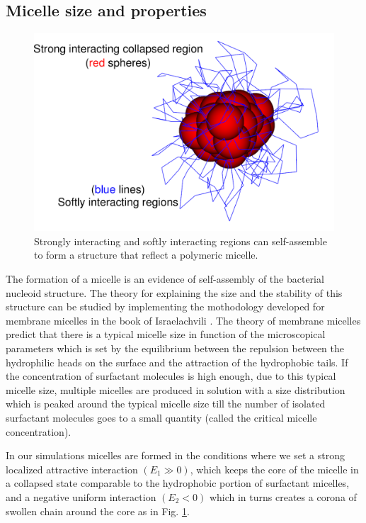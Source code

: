 \documentclass[12pt,a4paper,notitlepage]{article}
\begin{document}
\subsection{Micelle size and properties}
\begin{figure}[h!]
\centering
\includegraphics[width=12cm]{micelle}
\caption{Strongly interacting and softly interacting regions can
  self-assemble to form a structure that reflect a polymeric micelle.}
\label{fig:micelle}
\end{figure}

The formation of a micelle is an evidence of self-assembly of the
bacterial nucleoid structure. The theory for explaining the size and
the stability of this structure can be studied by
implementing the mothodology developed for membrane micelles in
the book of Israelachvili \cite{israelachvili2011}. The theory of
membrane micelles predict that there is a typical micelle size in
function of the microscopical parameters which is set by the
equilibrium between the repulsion between the hydrophilic heads on the
surface and the attraction of the hydrophobic tails. If the
concentration of surfactant molecules is high enough, due to this
typical micelle size, multiple micelles are produced in solution with
a size distribution which is peaked around the typical micelle size
till the number of isolated surfactant molecules goes to a small
quantity (called the critical micelle concentration).

In our simulations micelles are formed in the conditions where we set
a strong localized attractive interaction $(E_1 \gg 0)$, which keeps
the core of the micelle in a collapsed state comparable to the
hydrophobic portion of surfactant micelles, and a negative uniform
interaction $(E_2 < 0)$ which in turns creates a corona of swollen
chain around the core as in Fig. \ref{fig:micelle}.
\end{document}
